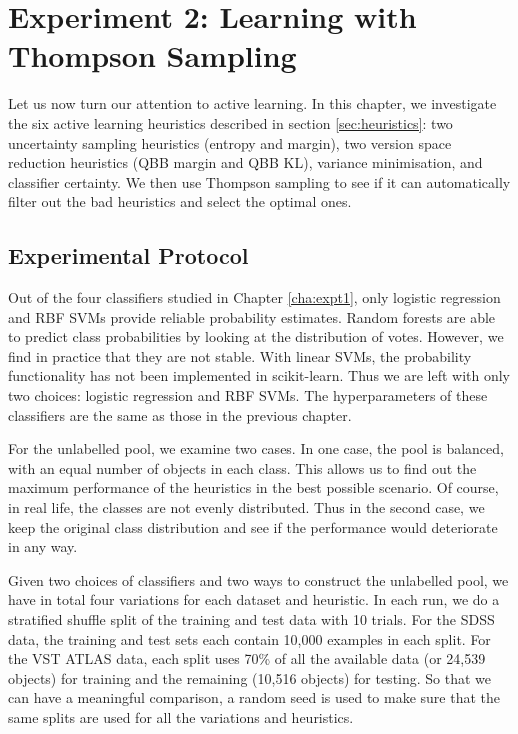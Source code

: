 

\chapter{Experiment 2: Learning with Thompson Sampling}
\label{cha:expt2}

Let us now turn our attention to active learning. In this chapter, we investigate the six active
learning heuristics described in section \ref{sec:heuristics}: two uncertainty sampling heuristics
(entropy and margin), two version space reduction heuristics (QBB margin and QBB KL), variance
minimisation, and classifier certainty. We then use Thompson sampling to see if it can
automatically filter out the bad heuristics and select the optimal ones.


\section{Experimental Protocol}
\label{sec:protocol2}

Out of the four classifiers studied in Chapter \ref{cha:expt1}, only logistic regression and RBF
SVMs provide reliable probability estimates. Random forests are able to predict class probabilities
by looking at the distribution of votes. However, we find in practice that they are not stable.
With linear SVMs, the probability functionality has not been implemented in scikit-learn. Thus we
are left with only two choices: logistic regression and RBF SVMs. The hyperparameters of these
classifiers are the same as those in the previous chapter.

For the unlabelled pool, we examine two cases. In one case, the pool is balanced, with an equal
number of objects in each class. This allows us to find out the maximum performance of the
heuristics in the best possible scenario. Of course, in real life, the classes are not evenly
distributed. Thus in the second case, we keep the original class distribution and see if the
performance would deteriorate in any way.

Given two choices of classifiers and two ways to construct the unlabelled pool, we have in total
four variations for each dataset and heuristic. In each run, we do a stratified shuffle split of
the training and test data with 10 trials. For the SDSS data, the training and test sets each
contain 10,000 examples in each split. For the VST ATLAS data, each split uses 70\% of all the
available data (or 24,539 objects) for training and the remaining (10,516 objects) for testing.
So that we can have a meaningful comparison, a random seed is used to make sure that the same
splits are used for all the variations and heuristics.

